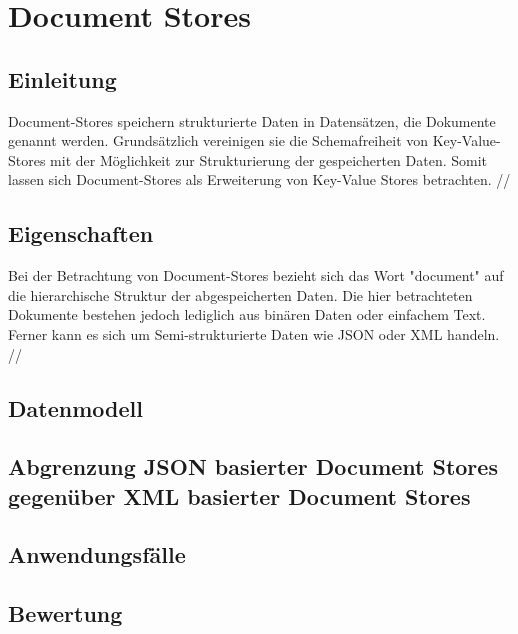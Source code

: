 \section{Document Stores}
\subsection{Einleitung}
Document-Stores speichern strukturierte Daten in Datensätzen, die Dokumente genannt werden. Grundsätzlich vereinigen sie die Schemafreiheit von Key-Value-Stores mit der Möglichkeit zur Strukturierung der gespeicherten Daten. Somit lassen sich Document-Stores als Erweiterung von Key-Value Stores betrachten. 
//
\subsection{Eigenschaften}
Bei der Betrachtung von Document-Stores bezieht sich das Wort "document" auf die hierarchische Struktur der abgespeicherten Daten. Die hier betrachteten Dokumente bestehen jedoch lediglich aus binären Daten oder einfachem Text. Ferner kann es sich um Semi-strukturierte Daten wie JSON oder XML handeln. 
//


\subsection{Datenmodell}
\subsection{Abgrenzung JSON basierter Document Stores gegenüber XML basierter Document Stores}
\subsection{Anwendungsfälle}
\subsection{Bewertung}
